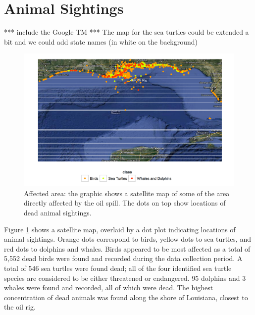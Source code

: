 \documentclass[authoryear,12pt]{elsarticle}
\begin{document}
\section{Animal Sightings}
***  include the Google TM
*** The map for the sea turtles could be extended a bit and we could add state names (in white on the background)

\begin{figure}[htbp] %
   \centering
   \includegraphics[width=4.5in]{animal_deaths.png} 
   \caption{Affected area: the graphic shows a satellite map of some of the area directly affected by the oil spill. The dots on top show locations of dead animal sightings. }
   \label{deaths}
\end{figure}
Figure \ref{deaths} shows a satellite map, overlaid by a dot plot indicating locations of animal sightings. Orange dots correspond to birds, yellow dots to sea turtles, and red dots to dolphins and whales.  Birds appeared to be most affected as a total of 5,552 dead birds were found and recorded during the data collection period.  A total of 546 sea turtles were found dead; all of the four identified sea turtle species are considered to be either threatened or endangered.  95 dolphins and 3 whales were found and recorded, all of which were dead. The highest concentration of dead animals was found along the shore of Louisiana, closest to the oil rig.  
\end{document}
